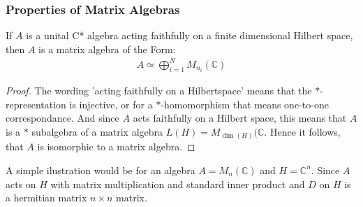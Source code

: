 \subsubsection{Properties of Matrix Algebras}
\begin{lemma}
    If $A$ is a unital C* algebra acting faithfully on a finite
    dimensional Hilbert space, then $A$ is a matrix algebra of the Form:
    \begin{align}
        A \simeq \bigoplus _{i=1}^N M_{n_i}(\mathbb{C})
    \end{align}
\end{lemma}
\begin{proof}
    The wording 'acting faithfully on a Hilbertspace' means that the
    $*$-representation is injective, or for a $*$-homomorphism that means
    one-to-one correspondance. And since $A$ acts faithfully on a Hilbert
    space, this means that $A$ is a $*$ subalgebra of a matrix algebra $L(H) = M_{\dim
    (H)}(\mathbb{C}$. Hence it follows, that $A$ is isomorphic to a matrix
    algebra.
\end{proof}

A simple ilustration would be for an algebra $A = M_n(\mathbb{C})$ and
$H=\mathbb{C}^n$. Since $A$ acts on $H$ with matrix multiplication and standard
inner product and $D$ on $H$ is a hermitian matrix $n\times n$ matrix.


